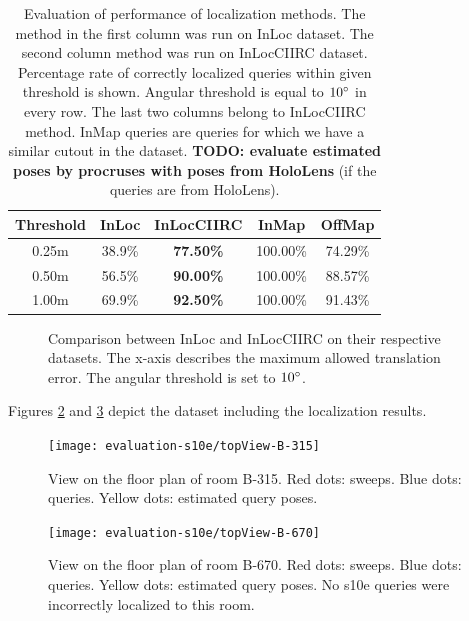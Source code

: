 \documentclass[twoside]{ctuthesis}
\theoremstyle{plain}
\theoremstyle{definition}
\theoremstyle{note}
\begin{document}
\begin{table}
	\centering
	\begin{tabular}{|c|c||c|c|c|}
		\hline
		Threshold & InLoc & \bfseries InLocCIIRC & InMap & OffMap \\
		\hline
		0.25m & 38.9\% & \bfseries 77.50\% & 100.00\% & 74.29\% \\
		0.50m & 56.5\% & \bfseries 90.00\% & 100.00\% & 88.57\% \\
		1.00m & 69.9\% & \bfseries 92.50\% & 100.00\% & 91.43\% \\
		\hline
	\end{tabular}
	\caption{Evaluation of performance of localization methods. The method in the first column was run on InLoc dataset. The second column method was run on InLocCIIRC dataset. Percentage rate of correctly localized queries within given threshold is shown. Angular threshold is equal to $10\degree$ in every row. The last two columns belong to InLocCIIRC method. InMap queries are queries for which we have a similar cutout in the dataset. \textbf{TODO: evaluate estimated poses by procruses with poses from HoloLens} (if the queries are from HoloLens).}
	\label{tab:estimation-performance}
\end{table}

\begin{figure}
	\centering
	
	\caption{Comparison between InLoc and InLocCIIRC on their respective datasets. The x-axis describes the maximum allowed translation error. The angular threshold is set to $10\degree$.}
	\label{fig:dist-thresh-vs-accuracy}
\end{figure}

Figures \ref{fig:topView-B-315} and \ref{fig:topView-B-670} depict the dataset including the localization results.

\begin{figure}
	\centering
 	\texttt{[image: evaluation-s10e/topView-B-315]}
 	\caption{View on the floor plan of room B-315. Red dots: sweeps. Blue dots: queries. Yellow dots: estimated query poses.}
 	\label{fig:topView-B-315}
\end{figure} 

\begin{figure}
	\centering
 	\texttt{[image: evaluation-s10e/topView-B-670]}
 	\caption{View on the floor plan of room B-670. Red dots: sweeps. Blue dots: queries. Yellow dots: estimated query poses. No s10e queries were incorrectly localized to this room.}
 	\label{fig:topView-B-670}
\end{figure} 

\appendix

\printindex

\appendix

%



\end{document}
